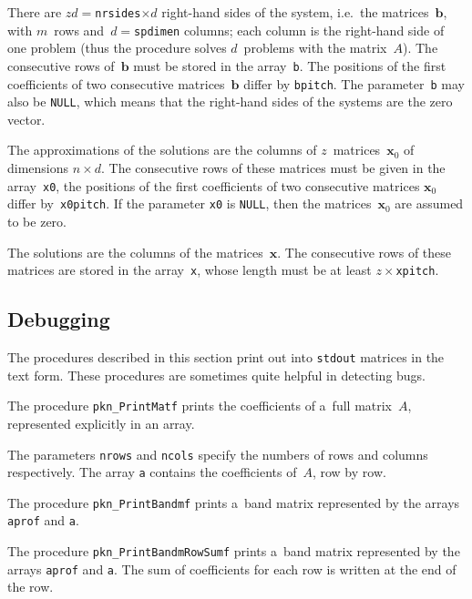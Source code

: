 There are $zd=$\texttt{nrsides}$\times d$ right-hand sides of the system,
i.e.\ the matrices~$\bm{b}$, with $m$~rows and~$d=$\texttt{spdimen} columns;
each column is the right-hand side of
one problem (thus the procedure solves $d$~problems with the matrix~$A$).
The consecutive rows of~$\bm{b}$ must be stored in the array~\texttt{b}.
The positions of the first coefficients of two consecutive matrices~$\bm{b}$
differ by \texttt{bpitch}.
The parameter~\texttt{b} may also be \texttt{NULL}, which means that
the right-hand sides of the systems are the zero vector.

The approximations of the solutions are the columns of $z$~matrices~$\bm{x}_0$
of dimensions $n\times d$. The consecutive rows of these matrices
must be given in the array~\texttt{x0}, the positions of the first coefficients
of two consecutive matrices $\bm{x}_0$ differ by~\texttt{x0pitch}.
If the parameter \texttt{x0} is \texttt{NULL}, then the matrices~$\bm{x}_0$ are
assumed to be zero.

The solutions are the columns of the matrices~$\bm{x}$. The consecutive rows
of these matrices are stored in the array~\texttt{x}, whose length must be
at least $z\times$\texttt{xpitch}.


\newpage
\subsection{Debugging}

The procedures described in this section print out into \texttt{stdout}
matrices in the text form. These procedures are sometimes quite
helpful in detecting bugs.

\vspace{\bigskipamount}
The procedure \texttt{pkn\_PrintMatf} prints the coefficients of a~full
matrix~$A$, represented explicitly in an array.

The parameters \texttt{nrows} and \texttt{ncols} specify the numbers of rows and
columns respectively. The array \texttt{a} contains the coefficients of~$A$,
row by row.

\vspace{\bigskipamount}
The procedure \texttt{pkn\_PrintBandmf} prints a~band matrix represented
by the arrays \texttt{aprof} and \texttt{a}.

\vspace{\bigskipamount}
The procedure \texttt{pkn\_PrintBandmRowSumf} prints a~band matrix represented
by the arrays \texttt{aprof} and \texttt{a}. The sum of coefficients for
each row is written at the end of the row.

